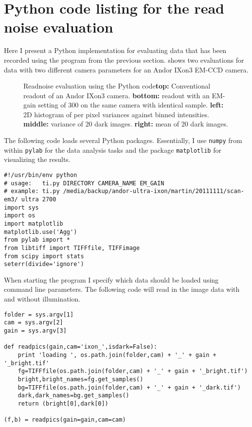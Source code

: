 \section{Python code listing for the read noise evaluation}
\label{sec:python-readnoise-eval}
Here I present a Python implementation for evaluating data that has
been recorded using the program from the previous
section.  shows two evaluations for data with two
different camera parameters for an Andor IXon3 EM-CCD camera.
\begin{figure}[htbp]
  \centering
  \caption{Readnoise evaluation using the Python code{\bf top:}
    Conventional readout of an Andor IXon3 camera. {\bf bottom:}
    readout with an EM-gain setting of 300 on the same camera with
    identical sample. {\bf left:} 2D histogram of per pixel variances
    against binned intensities. {\bf middle:} variance of 20 dark
    images. {\bf right:} mean of 20 dark images.}
  \label{fig:ixon}
\end{figure}
The following code loads several Python packages. Essentially, I use
\verb!numpy! from within \verb!pylab! \cite{Jones} for the data
analysis tasks and the package \verb!matplotlib! \cite{Hunter:2007}
for visualizing the results.
\begin{lstlisting}[style=mypython]
#!/usr/bin/env python
# usage:   ti.py DIRECTORY CAMERA_NAME EM_GAIN
# example: ti.py /media/backup/andor-ultra-ixon/martin/20111111/scan-em3/ ultra 2700
import sys
import os
import matplotlib
matplotlib.use('Agg')
from pylab import *
from libtiff import TIFFfile, TIFFimage
from scipy import stats
seterr(divide='ignore')
\end{lstlisting}
When starting the program I specify which data should be loaded using
command line parameters. The following code will read in the image
data with and without illumination.
\begin{lstlisting}[style=mypython]
folder = sys.argv[1]
cam = sys.argv[2]
gain = sys.argv[3]

def readpics(gain,cam='ixon_',isdark=False):
    print 'loading ', os.path.join(folder,cam) + '_' + gain + '_bright.tif'
    fg=TIFFfile(os.path.join(folder,cam) + '_' + gain + '_bright.tif')
    bright,bright_names=fg.get_samples()
    bg=TIFFfile(os.path.join(folder,cam) + '_' + gain + '_dark.tif')    
    dark,dark_names=bg.get_samples()
    return (bright[0],dark[0])

(f,b) = readpics(gain=gain,cam=cam)
\end{lstlisting}
